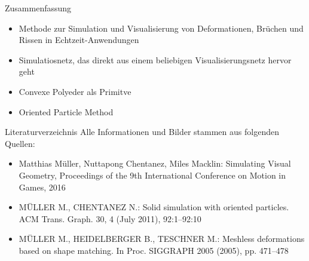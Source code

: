 \documentclass[t]{beamer}
\begin{document}
	\begin{frame}{Zusammenfassung}
		\begin{itemize}
			\item Methode zur Simulation und Visualisierung von Deformationen, Brüchen und Rissen in Echtzeit-Anwendungen
			\item Simulatiosnetz, das direkt aus einem beliebigen Visualisierungsnetz hervor geht
			\item Convexe Polyeder als Primitve
			\item Oriented Particle Method
		\end{itemize}
	\end{frame}

	\begin{frame}{Literaturverzeichnis}
		Alle Informationen und Bilder stammen aus folgenden Quellen:
		\begin{itemize}
			\item Matthias Müller, Nuttapong Chentanez, Miles Macklin: Simulating Visual Geometry, Proceedings of the 9th International Conference on Motion in Games, 2016
			\item MÜLLER M., CHENTANEZ N.: Solid simulation with oriented particles. ACM Trans. Graph. 30, 4 (July 2011), 92:1–92:10
			\item MÜLLER M., HEIDELBERGER B., TESCHNER M.: Meshless deformations based on shape matching. In Proc. SIGGRAPH 2005 (2005), pp. 471–478
		\end{itemize}
	\end{frame}
\end{document}
